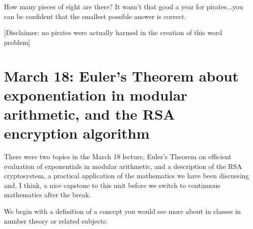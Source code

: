 \documentclass[12pt]{article}
\begin{document}
\begin{enumerate}
How many pieces of eight are there?  It wasn't that good  a year for pirates...you can be confident that the smallest possible answer is correct.

[Disclaimer:  no pirates were actually harmed in the creation of this word problem]

\begin{comment}

\item  Use Fermat's Little Theorem to compute $5^{21355} {\tt mod} 17$.

Use the lemma about computation of $\phi(pq)$ to compute $7^{1000} {\tt mod} 35$.  This calculation will end up with some easy repeated squaring, not nearly as much as with an exponent of 1000.

\item  Let $N = (13)(17) = 221$.  Leet $r=5$.   Verify that $r$ is an appropriate encryption exponent
and determine the decryption exponent $s$.

Encrypt the message 100 then decrypt the result.

\end{comment}


\end{enumerate}


\section{March 18:  Euler's Theorem about exponentiation in modular arithmetic, and the RSA encryption algorithm}

There were two topics in the March 18 lecture, Euler's Theorem on efficient evaluation of exponentials in modular arithmetic, and a description of the RSA cryptosystem, a practical application of the mathematics we have been discussing and, I think, a nice capstone to this unit before we switch to continuous mathematics after the break.

We begin with a definition of a concept you would see more about in classes in number theory or related subjects:
\end{document}
